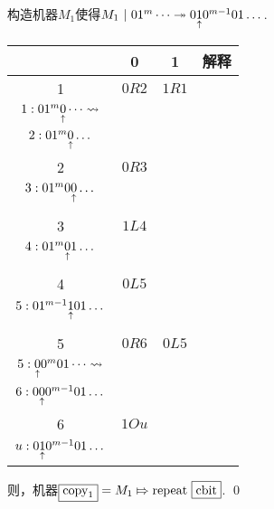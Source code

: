 \begin{pf}
    构造机器$M_1$使得$M_1\ | \  01^{m}\dots \twoheadrightarrow 0\underset{\substack{\uparrow}}{1}0^{m-1}01\dots$. 
    \begin{center}
        \footnotesize
        \begin{tabular}{ |c|c|c|c| } 
        \hline
          & 0 & 1 & 解释 \\ 
        \hline
        1 & $0R2$ & $1R1$ & \makecell{
            $1:0\pointer{1}^{m}\dots\leadsto$\\
            $1:01^m \underset{\substack{\uparrow}}{0} \dots\leadsto$\\
            $2: 01^{m} \underset{\substack{\uparrow}}{0} \dots $} 
        \\  \hline %
        2 & $0R3$ &  & \makecell{ 
            $2: 01^{m} \pointer{0} \dots\leadsto$\\
            $3: 01^{m} 0 \underset{\substack{\uparrow}}{0} \dots$\\
        }
        \\  \hline
        3 & $1L4$ &  & \makecell{ 
            $3: 01^{m} 0 \pointer{0} \dots\leadsto$\\
            $4: 01^{m} \underset{\substack{\uparrow}}{0} 1 \dots$\\
        }
        \\  \hline
        4 & $0L5$ &  & \makecell{ 
            $4: 01^{m} \pointer{0} 1 \dots\leadsto$\\
            $5: 01^{m-1} \underset{\substack{\uparrow}}{1} 0 1 \dots$\\
        }
        \\  \hline
        5 & $0R6$ & $0L5$ & \makecell{ 
            $5: 01^{m-1} \pointer{1} 0 1 \dots\leadsto$\\
            $5: \underset{\substack{\uparrow}}{0}0^{m} 0 1 \dots\leadsto$\\
            $6: 0\underset{\substack{\uparrow}}{0}0^{m-1}01\dots$
        }
        \\  \hline
        6 & $1Ou$ & & \makecell{ 
            $6: 0\pointer{0}0^{m-1}01\dots\leadsto$\\
            $u: 0\underset{\substack{\uparrow}}{1}0^{m-1}01\dots$
        }
        \\  \hline
            \end{tabular}
        \end{center}
        则，机器$\boxed{\textrm{copy}_1} = M_1 \Mapsto \mathrm{repeat}\ \boxed{\mathrm{cbit}} $.
    \qed
\end{pf}